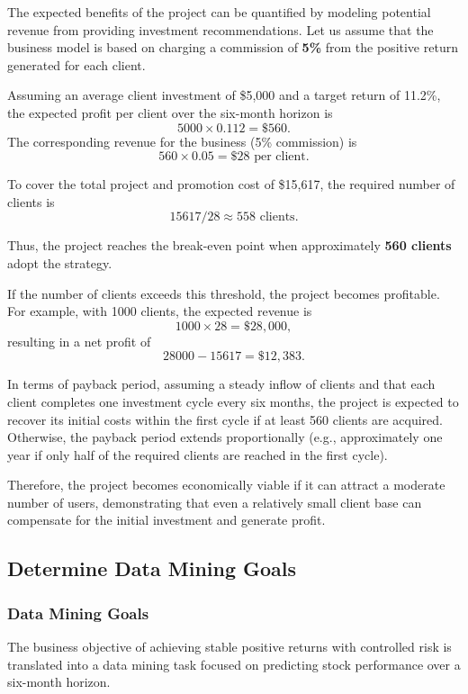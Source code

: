 \documentclass[oneside,final,12pt,a4paper]{extreport}
\begin{document}
The expected benefits of the project can be quantified by modeling potential revenue from providing investment recommendations. Let us assume that the business model is based on charging a commission of \textbf{5\%} from the positive return generated for each client.

Assuming an average client investment of \$5,000 and a target return of 11.2\%, the expected profit per client over the six-month horizon is
\[
5000 \times 0.112 = \$560.
\]
The corresponding revenue for the business (5\% commission) is
\[
560 \times 0.05 = \$28 \text{ per client}.
\]

To cover the total project and promotion cost of \$15,617, the required number of clients is
\[
15617 / 28 \approx 558 \text{ clients}.
\]

Thus, the project reaches the break-even point when approximately \textbf{560 clients} adopt the strategy.

If the number of clients exceeds this threshold, the project becomes profitable. For example, with 1000 clients, the expected revenue is
\[
1000 \times 28 = \$28{,}000,
\]
resulting in a net profit of
\[
28000 - 15617 = \$12{,}383.
\]

In terms of payback period, assuming a steady inflow of clients and that each client completes one investment cycle every six months, the project is expected to recover its initial costs within the first cycle if at least 560 clients are acquired. Otherwise, the payback period extends proportionally (e.g., approximately one year if only half of the required clients are reached in the first cycle).

Therefore, the project becomes economically viable if it can attract a moderate number of users, demonstrating that even a relatively small client base can compensate for the initial investment and generate profit.


\subsection{Determine Data Mining Goals}

\subsubsection{Data Mining Goals}

The business objective of achieving stable positive returns with controlled risk is translated into a data mining task focused on predicting stock performance over a six-month horizon.
\end{document}
